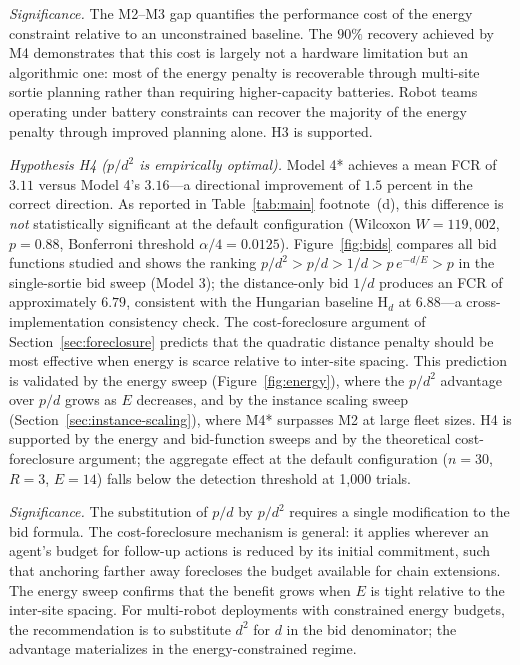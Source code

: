 \begin{doublespacing}
\emph{Significance.} The M2--M3 gap quantifies the performance cost
of the energy constraint relative to an unconstrained baseline.
The $90\%$ recovery achieved by M4 demonstrates that this cost is
largely not a hardware limitation but an algorithmic one: most of
the energy penalty is recoverable through multi-site sortie planning
rather than requiring higher-capacity batteries.
Robot teams operating under battery constraints can recover the
majority of the energy penalty through improved planning alone.
H3 is supported.

\emph{Hypothesis H4 ($p/d^2$ is empirically optimal).} Model 4*
achieves a mean FCR of $3.11$ versus Model 4's $3.16$---a directional
improvement of $1.5$ percent in the correct direction. As reported in
Table~\ref{tab:main} footnote~(d), this difference is \emph{not}
statistically significant at the default configuration (Wilcoxon $W = 119{,}002$,
$p = 0.88$, Bonferroni threshold $\alpha/4 = 0.0125$).
Figure~\ref{fig:bids} compares all bid functions studied and shows the
ranking $p/d^2 > p/d > 1/d > p\,e^{-d/E} > p$ in the single-sortie
bid sweep (Model 3); the distance-only bid $1/d$ produces an FCR of
approximately $6.79$, consistent with the Hungarian baseline H$_d$ at
$6.88$---a cross-implementation consistency check.
The cost-foreclosure argument of Section~\ref{sec:foreclosure} predicts
that the quadratic distance penalty should be most effective when energy
is scarce relative to inter-site spacing. This prediction is validated
by the energy sweep (Figure~\ref{fig:energy}), where the $p/d^2$
advantage over $p/d$ grows as $E$ decreases, and by the instance
scaling sweep (Section~\ref{sec:instance-scaling}), where M4* surpasses
M2 at large fleet sizes. H4 is supported by the energy and bid-function
sweeps and by the theoretical cost-foreclosure argument; the aggregate
effect at the default configuration ($n = 30$, $R = 3$, $E = 14$) falls
below the detection threshold at 1,000 trials.

\emph{Significance.} The substitution of $p/d$ by $p/d^2$ requires
a single modification to the bid formula.
The cost-foreclosure mechanism is general: it applies wherever an
agent's budget for follow-up actions is reduced by its initial
commitment, such that anchoring farther away forecloses the budget
available for chain extensions.
The energy sweep confirms that the benefit grows when $E$ is tight
relative to the inter-site spacing.
For multi-robot deployments with constrained energy budgets, the
recommendation is to substitute $d^2$ for $d$ in the bid
denominator; the advantage materializes in the energy-constrained
regime.


\end{doublespacing}
